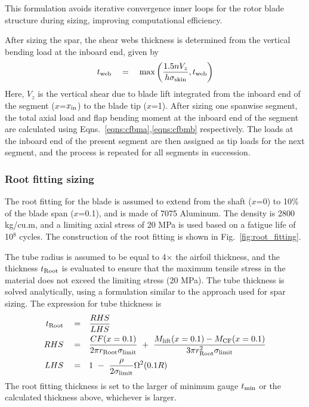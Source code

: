This formulation avoids iterative convergence inner loops for the rotor blade structure during sizing, improving computational efficiency. 

After sizing the spar, the shear webs thickness is determined from the vertical bending load at the inboard end, given by 
\begin{equation*}
t_{\rm web} \quad = \quad \max\left(\frac{1.5 n V_z}{h \sigma_{\rm skin}},t_{\rm web}\right)
\end{equation*}
Here, $V_z$ is the vertical shear due to blade lift integrated from the inboard end of the segment ($x$=$x_{\rm in}$) to the blade tip ($x$=1). After sizing one spanwise segment, the total axial load and flap bending moment at the inboard end of the segment are calculated using Eqns.~\ref{eqns:cfbma},\ref{eqns:cfbmb} respectively. The loads at the inboard end of the present segment are then assigned as tip loads for the next segment, and the process is repeated for all segments in succession. 

\subsubsection{Root fitting sizing}

The root fitting for the blade is assumed to extend from the shaft ($x$=0) to 10\% of the blade span ($x$=0.1), and is made of 7075 Aluminum. The density is 2800 kg/cu.m, and a limiting axial stress of 20 MPa is used based on a fatigue life of 10$^8$ cycles. The construction of the root fitting is shown in Fig.~\ref{fig:root_fitting}.
 
The tube radius is assumed to be equal to 4$\times$ the airfoil thickness, and the thickness $t_{\rm Root}$ is evaluated to ensure that the maximum tensile stress in the material does not exceed the limiting stress (20 MPa). The tube thickness is solved analytically, using a formulation similar to the approach used for spar sizing. The expression for tube thickness is 
\begin{align*}
t_{\rm Root} \quad = & \quad \frac{RHS}{LHS} \\
RHS \quad = & \quad \frac{CF(x=0.1)}{2 \pi r_{\rm Root} \sigma_{\rm limit}} \textrm{ }+\textrm{ } \frac{M_{\rm lift}(x=0.1)-M_{\rm CF}(x=0.1)}{3 \pi r_{\rm Root}^2 \sigma_{\rm limit}} \\
LHS \quad = & \quad 1 \textrm{ }-\textrm{ } \frac{\rho}{2 \sigma_{\rm limit}} \Omega^2 (0.1 R) 
\end{align*}
The root fitting thickness is set to the larger of minimum gauge $t_{\rm min}$ or the calculated thickness above, whichever is larger. 

